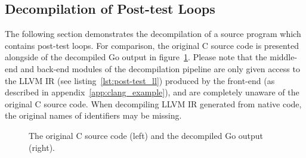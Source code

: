 
\subsection{Decompilation of Post-test Loops}
\label{app:decompilation_of_post-test_loops}

The following section demonstrates the decompilation of a source program which contains post-test loops. For comparison, the original C source code is presented alongside of the decompiled Go output in figure~\ref{fig:post-test_comparison}. Please note that the middle-end and back-end modules of the decompilation pipeline are only given access to the LLVM IR (see listing~\ref{lst:post-test_ll}) produced by the front-end (as described in appendix~\ref{app:clang_example}), and are completely unaware of the original C source code. When decompiling LLVM IR generated from native code, the original names of identifiers may be missing.

\begin{figure}[htbp]
	\centering
	\begin{subfigure}[t]{0.49\textwidth}
		
	\end{subfigure}
	\qquad
	\begin{subfigure}[t]{0.31\textwidth}
		
	\end{subfigure}
	\caption{The original C source code (left) and the decompiled Go output (right).}
	\label{fig:post-test_comparison}
\end{figure}


